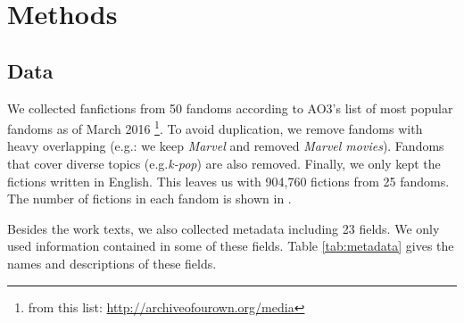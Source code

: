 \documentclass[a4paper]{article}
\begin{document}





\section{Methods} %
\label{sec:methods}


\subsection{Data}
We collected fanfictions from 50 fandoms according to AO3's list of most popular fandoms as of March 2016 \footnote{from this list: \url{http://archiveofourown.org/media}}. To avoid duplication, we remove fandoms with heavy overlapping (e.g.: we keep \emph{Marvel} and removed \emph{Marvel movies}). Fandoms that cover diverse topics (e.g.\emph{k-pop}) are also removed. Finally, we only kept the fictions written in English. This leaves us with 904,760 fictions from 25 fandoms. The number of fictions in each fandom is shown in .



Besides the work texts, we also collected metadata including 23 fields. We only used information contained in some of these fields. Table \ref{tab:metadata} gives the names and descriptions of these fields. 
\end{document}
